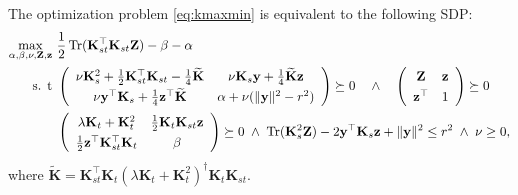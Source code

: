\documentclass[twoside,11pt]{article}
\DeclareMathOperator{\Tr}{Tr}
\newcommand{\wt}{\widetilde}
\newcommand{\mat}[1]{{\mathbf #1}}
\newcommand{\1}{\mat{1}}
\newcommand{\Ks}{\mat{K}_s}
\newcommand{\Kst}{\mat{K}_{st}}
\newcommand{\Kt}{\mat{K}_{t}}
\newcommand{\y}{\mat{y}}
\newcommand{\z}{\mat{z}}
\newcommand{\Z}{\mat{Z}}
\begin{document}
\begin{proposition}
The optimization problem \eqref{eq:kmaxmin} is equivalent to the
following SDP:
\begin{align*}
\max_{\alpha, \beta, \nu, \Z, \z} & \ \frac{1}{2} \Tr(\Kst^\top \Kst \Z)
- \beta - \alpha\\
\text{s. t} & \ \left(
\def\arraystretch{1.3}
\begin{array}{cc}
\nu \Ks^2 + \frac{1}{2}\Kst^\top \Kst - \frac{1}{4} \wt{\mat K}
& \nu  \Ks \y + \frac{1}{4}\wt{\mat K} \z \\
\nu  \y^\top \Ks + \frac{1}{4} \z^\top \wt{\mat K}
&\alpha + \nu (\|\y\|^2 - r^2)
\end{array}
\right) \succeq 0 \quad \wedge \quad
\left(
\begin{array}{cc}
\Z & \z \\
\z^\top & 1
\end{array}
\right) \succeq 0 \\
& \ \left(
\def\arraystretch{1.3}
\begin{array}{cc}
\lambda \Kt + \Kt^2 & \frac{1}{2} \Kt \Kst \z \\
\frac{1}{2} \z^\top \Kst^\top \Kt & \beta
\end{array}
\right) \succeq 0
\; \wedge \; \Tr(\Ks^2 \Z) - 2\y^\top \Ks \z + \|\y\|^2 \leq r^2
\; \wedge \; \nu \geq 0,
\end{align*}
where $\wt{\mat K} = \Kst^\top \Kt (\lambda \Kt + \Kt^2)^\dag \Kt \Kst$.
\end{proposition}
\end{document}
